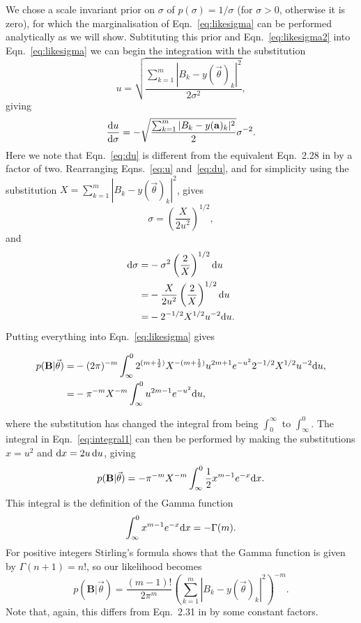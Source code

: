 We chose a scale invariant prior on $\sigma$ of $p(\sigma) = 1/\sigma$ (for $\sigma > 0$, otherwise it is
zero), for which the marginalisation of Eqn.~\ref{eq:likesigma} can be performed analytically as we will show.
Subtituting this prior and Eqn.~\ref{eq:likesigma2} into Eqn.~\ref{eq:likesigma} we can begin the
integration with the substitution
\begin{equation}\label{eq:u}
u = \sqrt{\frac{\sum_{k=1}^m|B_k-y(\vec{\theta})_k|^2}{2\sigma^2}},
\end{equation}
giving
\begin{equation}\label{eq:du}
\frac{{\rm d}u}{{\rm d}\sigma} = -\sqrt{\frac{\sum_{k=1}^m|B_k-y(\mathbf{a})_k|^2}{2}}\sigma^{-2}.
\end{equation}
Here we note that Eqn.~\ref{eq:du} is different from the equivalent Eqn.~2.28 in \citet{Dupuisthesis} by a
factor of two. Rearranging Eqns.~\ref{eq:u} and~\ref{eq:du}, and for simplicity using the substitution $X =
\sum_{k=1}^m |B_k-y(\vec{\theta})_k|^2$, gives
\begin{equation}
\sigma = \left(\frac{X}{2u^2}\right)^{1/2},
\end{equation}
and
\begin{align}
{\rm d}\sigma = & -\sigma^2 \left(\frac{2}{X}\right)^{1/2} {\rm d}u
\nonumber \\
 = & -\frac{X}{2u^2} \left(\frac{2}{X}\right)^{1/2} {\rm d}u \nonumber \\
 = & - 2^{-1/2} X^{1/2} u^{-2} {\rm d}u.
\end{align}
Putting everything into Eqn.~\ref{eq:likesigma} gives
\begin{widetext}
\begin{align}\label{eq:integral1}
p(\mathbf{B}|\vec{\theta})= & -(2\pi)^{-m} \int_{\infty}^0 2^{(m+\frac{1}{2})}
X^{-(m+\frac{1}{2})} u^{2m+1} e^{-u^2} 2^{-1/2} X^{1/2} u^{-2} {\rm d}u, \nonumber \\
 = & -\pi^{-m} X^{-m} \int_{\infty}^0 u^{2m-1} e^{-u^2} {\rm d}u,
\end{align}
\end{widetext}
where the substitution has changed the integral from being $\int_0^{\infty}$ to $\int_{\infty}^0$. The
integral in Eqn.~\ref{eq:integral1} can then be performed by making the substitutions $x = u^2$ and ${\rm d}x
= 2u\,{\rm d}u$, giving
\begin{equation}
p(\mathbf{B}|\vec{\theta}) = - \pi^{-m} X^{-m} \int_{\infty}^0 \frac{1}{2} x^{m-1} e^{-x}
{\rm d}x.
\end{equation}
This integral is the definition of the Gamma function
\begin{equation}
 \int_{\infty}^0 x^{m-1} e^{-x} {\rm d}x = -\Gamma(m).
\end{equation}
For positive integers Stirling's formula shows that the Gamma function is given by $\Gamma(n+1) = n!$, so our
likelihood becomes
\begin{equation}\label{eq:complex}
p(\mathbf{B}|\vec{\theta}) = \frac{(m-1)!}{2\pi^m} \left(\sum_{k=1}^m
|B_k-y(\vec{\theta})_k|^2\right)^{-m}.
\end{equation}
Note that, again, this differs from Eqn.~2.31 in \citet{Dupuisthesis} by some constant factors.

